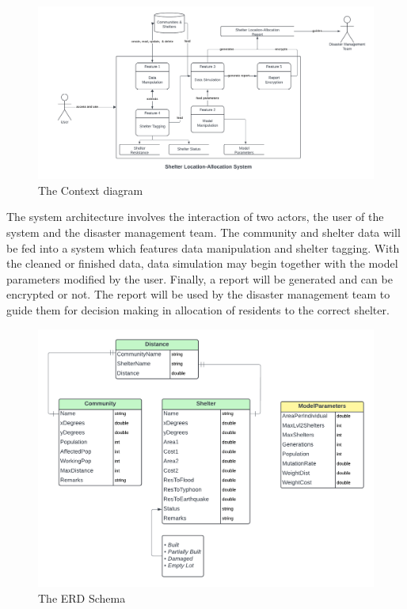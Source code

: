 \begin{figure}[h!]
	\caption{The Context diagram}
	\centering
	\includegraphics[width=\textwidth]{Context Diagram}
\end{figure}

The system architecture involves the interaction of two actors, the user of the system and the disaster management team. The community and shelter data will be fed into a system which features data manipulation and shelter tagging. With the cleaned or finished data, data simulation may begin together with the model parameters modified by the user. Finally, a report will be generated and can be encrypted or not. The report will be used by the disaster management team to guide them for decision making in allocation of residents to the correct shelter.

\begin{figure}[h!]
	\caption{The ERD Schema}
	\centering
	\includegraphics[width=\textwidth]{ERD}
\end{figure}

